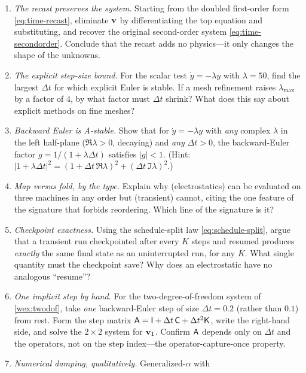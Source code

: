 \exercisessection
\begin{enumerate}[nosep]
  \item \emph{The recast preserves the system.} Starting from the doubled
  first-order form \cref{eq:time-recast}, eliminate $\mathbf{v}$ by differentiating the
  top equation and substituting, and recover the original second-order system
  \cref{eq:time-secondorder}. Conclude that the recast adds no physics---it only
  changes the shape of the unknowns.
  \item \emph{The explicit step-size bound.} For the scalar test $\dot y =
  -\lambda y$ with $\lambda = 50$, find the largest $\Delta t$ for which explicit
  Euler is stable. If a mesh refinement raises $\lambda_{\max}$ by a factor of $4$,
  by what factor must $\Delta t$ shrink? What does this say about explicit methods
  on fine meshes?
  \item \emph{Backward Euler is A-stable.} Show that for $\dot y = -\lambda y$ with
  \emph{any} complex $\lambda$ in the left half-plane ($\Re\lambda > 0$, decaying)
  and \emph{any} $\Delta t > 0$, the backward-Euler factor $g = 1/(1 +
  \lambda\Delta t)$ satisfies $|g| < 1$. (Hint: $|1 + \lambda\Delta t|^2 = (1 +
  \Delta t\,\Re\lambda)^2 + (\Delta t\,\Im\lambda)^2$.)
  \item \emph{Map versus fold, by the type.} Explain why 
  (electrostatics) can be evaluated on three machines in any order but
   (transient) cannot, citing the one feature of the
   signature that forbids reordering. Which line of the signature
  is it?
  \item \emph{Checkpoint exactness.} Using the schedule-split law
  \cref{eq:schedule-split}, argue that a transient run checkpointed after every
  $K$ steps and resumed produces \emph{exactly} the same final state as an
  uninterrupted run, for any $K$. What single quantity must the checkpoint save?
  Why does an electrostatic  have no analogous ``resume''?
  \item \emph{One implicit step by hand.} For the two-degree-of-freedom system of
  \cref{wex:twodof}, take \emph{one} backward-Euler step of size $\Delta t = 0.2$
  (rather than $0.1$) from rest. Form the step matrix $\mathsf{A} = \mathsf{I} + \Delta
  t\,\mathsf{C} + \Delta t^2\mathsf{K}$, write the right-hand side, and solve the $2\times 2$
  system for $\mathbf{v}_1$. Confirm $\mathsf{A}$ depends only on $\Delta t$ and the operators,
  not on the step index---the operator-capture-once property.
  \item \emph{Numerical damping, qualitatively.} Generalized-$\alpha$ with

\end{enumerate}
